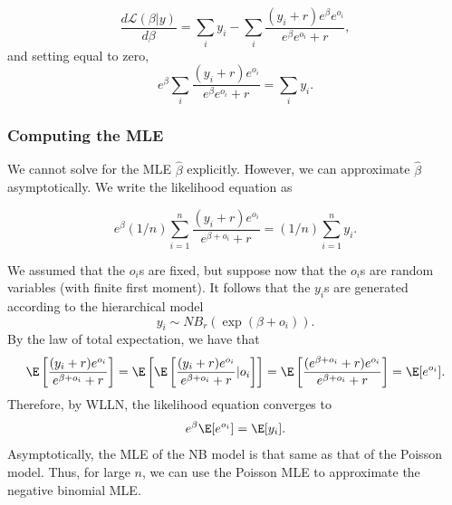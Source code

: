 \documentclass[12pt]{article}
\begin{document}
$$ \frac{ d \mathcal{L} (\beta | y) }{ d \beta } = \sum_i y_i - \sum_i \frac{ (y_i + r) e^\beta e^{o_i} }{ e^\beta e^{o_i} + r },$$ and setting equal to zero,
 $$ e^\beta \sum_i \frac{ (y_i + r) e^{o_i} }{ e^\beta e^{o_i} + r  }  = \sum_i y_i.$$ 
 
 \subsubsection{Computing the MLE}
 
 We cannot solve for the MLE $\hat{\beta}$ explicitly. However, we can approximate $\hat{\beta}$ asymptotically. We write the likelihood equation as
 
 $$e^\beta  (1/n) \sum_{i=1}^n \frac{ (y_i + r)e^{o_i} }{ e^{\beta + o_i} + r } = (1/n) \sum_{i=1}^n y_i.$$ 
 
We assumed that the $o_i$s are fixed, but suppose now that the $o_i$s are random variables (with finite first moment). It follows that the $y_i$s are generated according to the hierarchical model 
$$y_i \sim NB_r(\exp( \beta + o_i)) .$$ By the law of total expectation, we have that
\begin{multline*} \E \left[ \frac{(y_i + r) e^{o_i}}{ e^{\beta + o_i} + r } \right] = \E \left[ \E\left[ \frac{ (y_i + r) e^{o_i} }{ e^{\beta + o_i} + r } | o_i\right] \right] = \E \left[ \frac{ (e^{\beta + o_i} + r) e^{o_i}}{ e^{\beta + o_i} + r } \right] = \E [ e^{o_i} ].
\end{multline*}
 Therefore, by WLLN, the likelihood equation converges to
 $$ e^{\beta} \E[ e^{o_i} ] = \E[y_i].$$ Asymptotically, the MLE of the NB model is that same as that of the Poisson model. Thus, for large $n$, we can use the Poisson MLE to approximate the negative binomial MLE.
 
 
 




\end{document}
